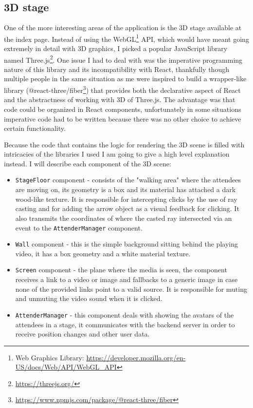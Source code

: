 \subsection{3D stage}

One of the more interesting areas of the application is the 3D stage available at the index page. Instead of using the WebGL\footnote{Web Graphics Library: \href{https://developer.mozilla.org/en-US/docs/Web/API/WebGL_API}{https://developer.mozilla.org/en-US/docs/Web/API/WebGL\_API}} API, which would have meant going extremely in detail with 3D graphics, I picked a popular JavaScript library named Three.js\footnote{\href{https://threejs.org/}{https://threejs.org/}}. One issue I had to deal with was the imperative programming nature of this library and its incompatibility with React, thankfully though multiple people in the same situation as me were inspired to build a wrapper-like library (@react-three/fiber\footnote{\href{https://www.npmjs.com/package/@react-three/fiber}{https://www.npmjs.com/package/@react-three/fiber}}) that provides both the declarative aspect of React and the abstractness of working with 3D of Three.js. The advantage was that code could be organized in React components, unfortunately in some situations imperative code had to be written because there was no other choice to achieve certain functionality.

Because the code that contains the logic for rendering the 3D scene is filled with intricacies of the libraries I used I am going to give a high level explanation instead. I will describe each component of the 3D scene:

\begin{itemize}
	\item \verb|StageFloor| component - consists of the "walking area" where the attendees are moving on, its geometry is a box and its material has attached a dark wood-like texture. It is responsible for intercepting clicks by the use of ray casting and for adding the arrow object as a visual feedback for clicking. It also transmits the coordinates of where the casted ray intersected via an event to the \verb|AttenderManager| component.
	\item \verb|Wall| component - this is the simple background sitting behind the playing video, it has a box geometry and a white material texture.
	\item \verb|Screen| component - the plane where the media is seen, the component receives a link to a video or image and fallbacks to a generic image in case none of the provided links point to a valid source. It is responsible for muting and unmuting the video sound when it is clicked.
	\item \verb|AttenderManager| - this component deals with showing the avatars of the attendees in a stage, it communicates with the backend server in order to receive position changes and other user data.
\end{itemize}

